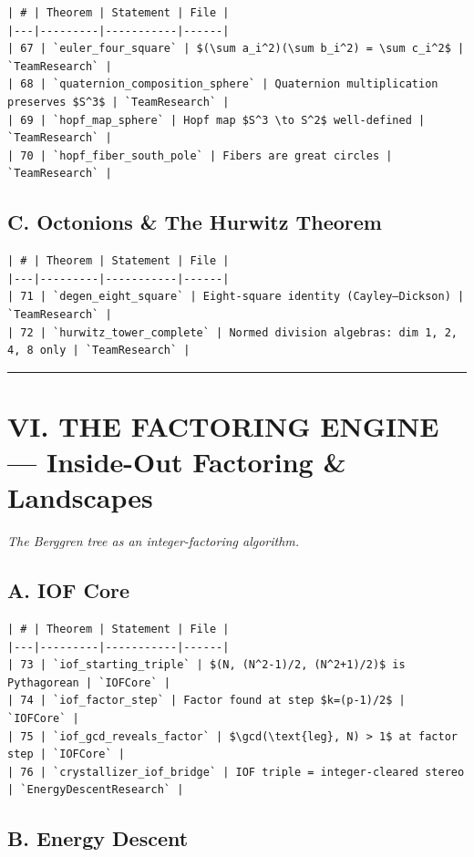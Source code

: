 \documentclass[12pt,a4paper,openany]{book}
\begin{document}
\begin{verbatim}
| # | Theorem | Statement | File |
|---|---------|-----------|------|
| 67 | `euler_four_square` | $(\sum a_i^2)(\sum b_i^2) = \sum c_i^2$ | `TeamResearch` |
| 68 | `quaternion_composition_sphere` | Quaternion multiplication preserves $S^3$ | `TeamResearch` |
| 69 | `hopf_map_sphere` | Hopf map $S^3 \to S^2$ well-defined | `TeamResearch` |
| 70 | `hopf_fiber_south_pole` | Fibers are great circles | `TeamResearch` |
\end{verbatim}

\subsection{C. Octonions \& The Hurwitz Theorem}

\begin{verbatim}
| # | Theorem | Statement | File |
|---|---------|-----------|------|
| 71 | `degen_eight_square` | Eight-square identity (Cayley–Dickson) | `TeamResearch` |
| 72 | `hurwitz_tower_complete` | Normed division algebras: dim 1, 2, 4, 8 only | `TeamResearch` |
\end{verbatim}

\bigskip\hrule\bigskip

\section{VI. THE FACTORING ENGINE — Inside-Out Factoring \& Landscapes}

\textit{The Berggren tree as an integer-factoring algorithm.}

\subsection{A. IOF Core}

\begin{verbatim}
| # | Theorem | Statement | File |
|---|---------|-----------|------|
| 73 | `iof_starting_triple` | $(N, (N^2-1)/2, (N^2+1)/2)$ is Pythagorean | `IOFCore` |
| 74 | `iof_factor_step` | Factor found at step $k=(p-1)/2$ | `IOFCore` |
| 75 | `iof_gcd_reveals_factor` | $\gcd(\text{leg}, N) > 1$ at factor step | `IOFCore` |
| 76 | `crystallizer_iof_bridge` | IOF triple = integer-cleared stereo | `EnergyDescentResearch` |
\end{verbatim}

\subsection{B. Energy Descent}
\end{document}
